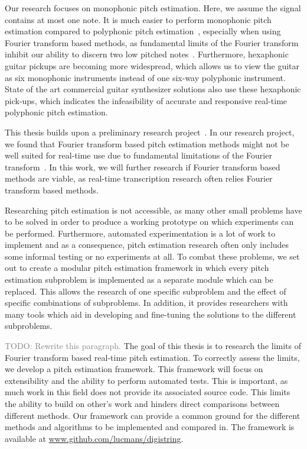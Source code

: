 \documentclass[10pt,twocolumn]{article}
\begin{document}
Our research focuses on monophonic pitch estimation. Here, we assume the signal contains at most one note. It is much easier to perform monophonic pitch estimation compared to polyphonic pitch estimation~\cite{monotopoly}, especially when using Fourier transform based methods, as fundamental limits of the Fourier transform inhibit our ability to discern two low pitched notes~\cite{nopoly}. Furthermore, hexaphonic guitar pickups are becoming more widespread, which allows us to view the guitar as six monophonic instruments instead of one six-way polyphonic instrument. State of the art commercial guitar synthesizer solutions also use these hexaphonic pick-ups, which indicates the infeasibility of accurate and responsive real-time polyphonic pitch estimation.

This thesis builds upon a preliminary research project~\cite{ik}. In our research project, we found that Fourier transform based pitch estimation methods might not be well suited for real-time use due to fundamental limitations of the Fourier transform~\cite{fourierlimit}. In this work, we will further research if Fourier transform based methods are viable, as real-time transcription research often relies Fourier transform based methods.

Researching pitch estimation is not accessible, as many other small problems have to be solved in order to produce a working prototype on which experiments can be performed. Furthermore, automated experimentation is a lot of work to implement and as a consequence, pitch estimation research often only includes some informal testing or no experiments at all. To combat these problems, we set out to create a modular pitch estimation framework in which every pitch estimation subproblem is implemented as a separate module which can be replaced. This allows the research of one specific subproblem and the effect of specific combinations of subproblems. In addition, it provides researchers with many tools which aid in developing and fine-tuning the solutions to the different subproblems.

\textcolor{gray}{TODO: Rewrite this paragraph.} The goal of this thesis is to research the limits of Fourier transform based real-time pitch estimation. To correctly assess the limits, we develop a pitch estimation framework. This framework will focus on extensibility and the ability to perform automated tests. This is important, as much work in this field does not provide its associated source code. This limits the ability to build on other's work and hinders direct comparisons between different methods. Our framework can provide a common ground for the different methods and algorithms to be implemented and compared in. The framework is available at \url{www.github.com/lucmans/digistring}.
\end{document}
